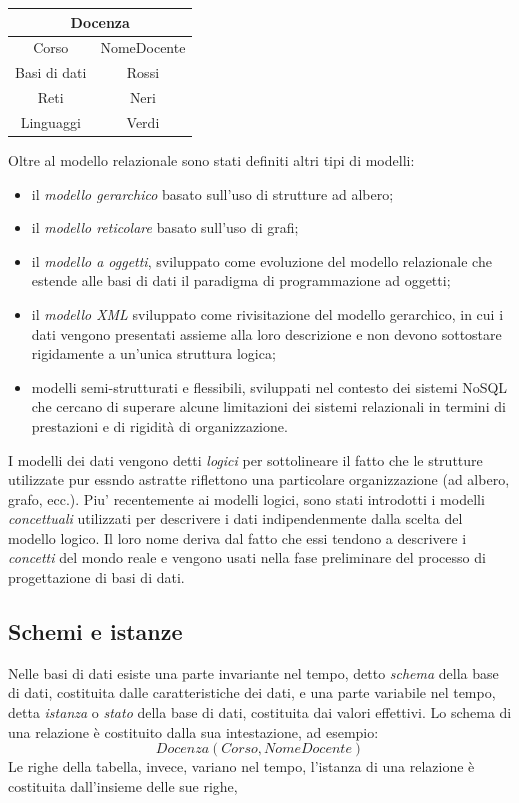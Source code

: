\documentclass[12pt]{report}
\begin{document}
			\begin{center}
			\begin{tabular}{|c|c|}
				\hline
				\multicolumn{2}{|c|}{Docenza} \\
				\hline
				Corso & NomeDocente \\
				\hline
				Basi di dati & Rossi \\
				Reti & Neri \\
				Linguaggi & Verdi \\
				\hline
			\end{tabular}
			\end{center}
			Oltre al modello relazionale sono stati definiti altri tipi di modelli:
			\begin{itemize}
				\item il \textit{modello gerarchico} basato sull'uso di strutture ad albero;
				\item il \textit{modello reticolare} basato sull'uso di grafi;
				\item il \textit{modello a oggetti}, sviluppato come evoluzione del modello relazionale che estende alle basi di dati il paradigma di programmazione ad oggetti;
				\item il \textit{modello XML} sviluppato come rivisitazione del modello gerarchico, in cui i dati vengono presentati assieme alla loro descrizione e non devono sottostare rigidamente a un'unica struttura logica;
				\item modelli semi-strutturati e flessibili, sviluppati nel contesto dei sistemi NoSQL che cercano di superare alcune limitazioni dei sistemi relazionali in termini di prestazioni e di rigidità di organizzazione.
			\end{itemize}
			I modelli dei dati vengono detti \textit{logici} per sottolineare il fatto che le strutture utilizzate pur essndo astratte riflettono una particolare organizzazione (ad albero, grafo, ecc.). Piu' recentemente ai modelli logici, sono stati introdotti i modelli \textit{concettuali} utilizzati per descrivere i dati indipendenmente dalla scelta del modello logico. Il loro nome deriva dal fatto che essi tendono a descrivere i \textit{concetti} del mondo reale e vengono usati nella fase preliminare del processo di progettazione di basi di dati.
			\subsection{Schemi e istanze}
			Nelle basi di dati esiste una parte invariante nel tempo, detto \textit{schema} della base di dati, costituita dalle caratteristiche dei dati, e una parte variabile nel tempo, detta \textit{istanza} o \textit{stato} della base di dati, costituita dai valori effettivi. Lo schema di una relazione è costituito dalla sua intestazione, ad esempio:
			\[
			Docenza(Corso, NomeDocente)
			\]
			Le righe della tabella, invece, variano nel tempo, l'istanza di una relazione è costituita dall'insieme delle sue righe,
\end{document}
